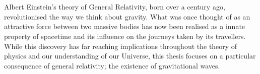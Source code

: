 \section*{\label{sec:introduction}}

Albert Einstein's theory of General Relativity, born over a century ago, revolutionised the way we think about gravity. What was once thought of as an attractive force between two massive bodies has now been realised as a innate property of spacetime and its influence on the journeys taken by its travellers. While this discovery has far reaching implications throughout the theory of physics and our understanding of our Universe, this thesis focuses on a particular consequence of general relativity; the existence of gravitational waves.








